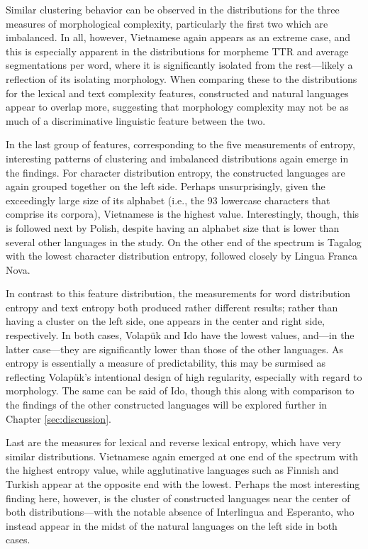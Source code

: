 \documentclass[12pt,a4paper]{article}
\numberwithin{figure}{section}
\numberwithin{table}{section}
\numberwithin{definition}{section}
\begin{document}
Similar clustering behavior can be observed in the distributions for the three measures of morphological complexity, particularly the first two which are imbalanced. In all, however, Vietnamese again appears as an extreme case, and this is especially apparent in the distributions for morpheme TTR and average segmentations per word, where it is significantly isolated from the rest---likely a reflection of its isolating morphology. When comparing these to the distributions for the lexical and text complexity features, constructed and natural languages appear to overlap more, suggesting that morphology complexity may not be as much of a discriminative linguistic feature between the two.

In the last group of features, corresponding to the five measurements of entropy, interesting patterns of clustering and imbalanced distributions again emerge in the findings. For character distribution entropy, the constructed languages are again grouped together on the left side. Perhaps unsurprisingly, given the exceedingly large size of its alphabet (i.e., the 93 lowercase characters that comprise its corpora), Vietnamese is the highest value. Interestingly, though, this is followed next by Polish, despite having an alphabet size that is lower than several other languages in the study. On the other end of the spectrum is Tagalog with the lowest character distribution entropy, followed closely by Lingua Franca Nova. 

In contrast to this feature distribution, the measurements for word distribution entropy and text entropy both produced rather different results; rather than having a cluster on the left side, one appears in the center and right side, respectively. In both cases, Volapük and Ido have the lowest values, and---in the latter case---they are significantly lower than those of the other languages. As entropy is essentially a measure of predictability, this may be surmised as reflecting Volapük's intentional design of high regularity, especially with regard to morphology. The same can be said of Ido, though this along with comparison to the findings of the other constructed languages will be explored further in Chapter \ref{sec:discussion}. 

Last are the measures for lexical and reverse lexical entropy, which have very similar distributions. Vietnamese again emerged at one end of the spectrum with the highest entropy value, while agglutinative languages such as Finnish and Turkish appear at the opposite end with the lowest. Perhaps the most interesting finding here, however, is the cluster of constructed languages near the center of both distributions---with the notable absence of Interlingua and Esperanto, who instead appear in the midst of the natural languages on the left side in both cases.
\end{document}
